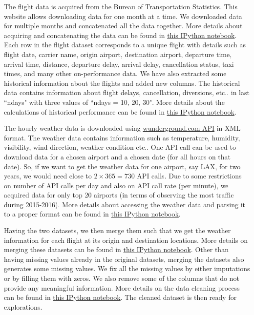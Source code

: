 \documentclass[12pt]{article}
\begin{document}
The flight data is acquired from the \href{https://www.transtats.bts.gov/DL_SelectFields.asp?Table_ID=236&DB_Short_Name=On-Time}{Bureau of Transportation Statistics}. This website allows downloading data for one month at a time. We downloaded data for multiple months and concatenated all the data together. More details about acquiring and concatenating the data can be found in \href{https://github.com/aajains/springboard-datascience-intensive/blob/master/capstone_project/DataAcquisitionMerging/data_acquisition_merging.ipynb}{this IPython notebook}. Each row in the flight dataset corresponds to a unique flight with details such as flight date, carrier name, origin airport, destination airport, departure time, arrival time, distance, departure delay, arrival delay, cancellation status, taxi times, and many other on-performance data. We have also extracted some historical information about the flights and added new columns. The historical data contains information about flight delays, cancellation, diversions, etc.. in last ``ndays" with three values of ``ndays = 10, 20, 30". More details about the calculations of historical performance can be found in \href{https://github.com/aajains/springboard-datascience-intensive/blob/master/capstone_project/DataAcquisitionMerging/history_calc.ipynb}{this IPython notebook}.


The hourly weather data is downloaded using \href{https://www.wunderground.com/weather/api}{wunderground.com API} in XML format. The weather data contains information such as temperature, humidity, visibility, wind direction, weather condition etc.. One API call can be used to download data for a chosen airport and a chosen date (for all hours on that date). So, if we want to get the weather data for one airport, say LAX, for two years, we would need close to $2 \times 365 = 730$ API calls. Due to some restrictions on number of API calls per day and also on API call rate (per minute), we acquired data for only top 20 airports (in terms of observing the most traffic during 2015-2016). More details about accessing the weather data and parsing it to a proper format can be found in \href{https://github.com/aajains/springboard-datascience-intensive/blob/master/capstone_project/DataAcquisitionMerging/weather.ipynb}{this IPython notebook}.

Having the two datasets, we then merge them such that we get the weather information for each flight at its origin and destination locations. More details on merging these datasets can be found in \href{https://github.com/aajains/springboard-datascience-intensive/blob/master/capstone_project/DataAcquisitionMerging/data_acquisition_merging.ipynb}{this IPython notebook}. Other than having missing values already in the original datasets, merging the datasets also generates some missing values. We fix all the missing values by either imputations or by filling them with zeros. We also remove some of the columns that do not provide any meaningful information. More details on the data cleaning process can be found in \href{https://github.com/aajains/springboard-datascience-intensive/blob/master/capstone_project/DataCleaning/data_cleaning.ipynb}{this IPython notebook}. The cleaned dataset is then ready for explorations.
\end{document}
